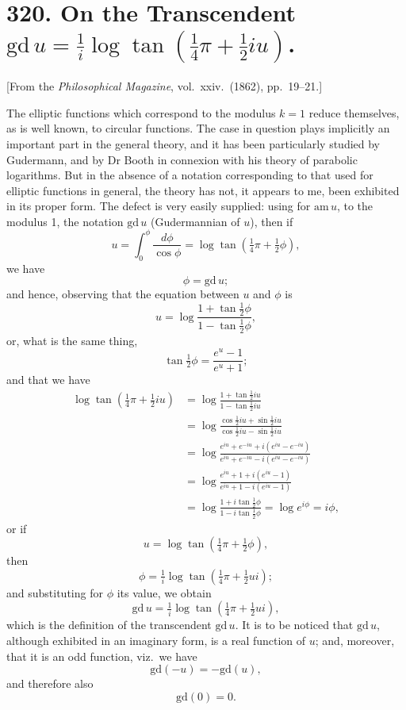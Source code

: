 \documentclass[11pt,a4paper]{article}
\theoremstyle{plain}
\begin{document}
\newpage
\section*{320. On the Transcendent $\mathrm{gd}\, u = \tfrac{1}{i}\log\tan(\tfrac{1}{4}\pi + \tfrac{1}{2}iu)$.}

[From the \textit{Philosophical Magazine}, vol.\ xxiv.\ (1862), pp.\ 19--21.]

\medskip

The elliptic functions which correspond to the modulus $k=1$ reduce themselves, as is well known, to circular functions. The case in question plays implicitly an important part in the general theory, and it has been particularly studied by Gudermann, and by Dr Booth in connexion with his theory of parabolic logarithms. But in the absence of a notation corresponding to that used for elliptic functions in general, the theory has not, it appears to me, been exhibited in its proper form. The defect is very easily supplied: using for $\mathrm{am}\, u$, to the modulus 1, the notation $\mathrm{gd}\, u$ (Gudermannian of $u$), then if
\[
u = \int_0^{\phi}\frac{d\phi}{\cos\phi} = \log\tan\!\left(\tfrac{1}{4}\pi + \tfrac{1}{2}\phi\right),
\]
we have
\[
\phi = \mathrm{gd}\, u;
\]
and hence, observing that the equation between $u$ and $\phi$ is
\[
u = \log\frac{1 + \tan\tfrac{1}{2}\phi}{1 - \tan\tfrac{1}{2}\phi},
\]
or, what is the same thing,
\[
\tan\tfrac{1}{2}\phi = \frac{e^u - 1}{e^u + 1};
\]
and that we have
\begin{align*}
\log\tan\!\left(\tfrac{1}{4}\pi + \tfrac{1}{2}iu\right) &= \log\frac{1 + \tan\tfrac{1}{2}iu}{1 - \tan\tfrac{1}{2}iu} \\
&= \log\frac{\cos\tfrac{1}{2}iu + \sin\tfrac{1}{2}iu}{\cos\tfrac{1}{2}iu - \sin\tfrac{1}{2}iu} \\
&= \log\frac{e^{iu} + e^{-iu} + i(e^{iu} - e^{-iu})}{e^{iu} + e^{-iu} - i(e^{iu} - e^{-iu})} \\
&= \log\frac{e^{iu} + 1 + i(e^{iu} - 1)}{e^{iu} + 1 - i(e^{iu} - 1)} \\
&= \log\frac{1 + i\tan\tfrac{1}{2}\phi}{1 - i\tan\tfrac{1}{2}\phi} = \log e^{i\phi} = i\phi,
\end{align*}
or if
\[
u = \log\tan\!\left(\tfrac{1}{4}\pi + \tfrac{1}{2}\phi\right),
\]
then
\[
\phi = \tfrac{1}{i}\log\tan\!\left(\tfrac{1}{4}\pi + \tfrac{1}{2}ui\right);
\]
and substituting for $\phi$ its value, we obtain
\[
\mathrm{gd}\, u = \tfrac{1}{i}\log\tan\!\left(\tfrac{1}{4}\pi + \tfrac{1}{2}ui\right),
\]
which is the definition of the transcendent $\mathrm{gd}\, u$. It is to be noticed that $\mathrm{gd}\, u$, although exhibited in an imaginary form, is a real function of $u$; and, moreover, that it is an odd function, viz.\ we have
\[
\mathrm{gd}(-u) = -\mathrm{gd}(u),
\]
and therefore also
\[
\mathrm{gd}(0) = 0.
\]
\end{document}
